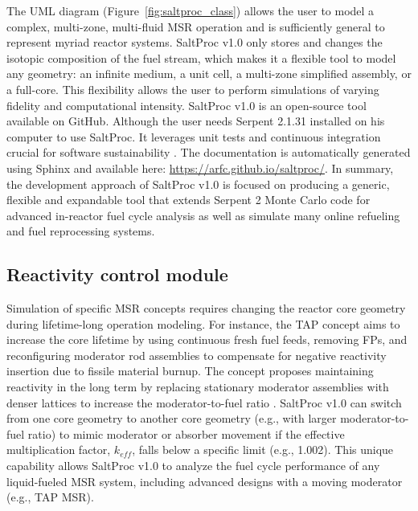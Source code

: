 The UML diagram (Figure~\ref{fig:saltproc_class}) allows the user to model a 
complex, multi-zone, multi-fluid \gls{MSR} operation and is sufficiently 
general to represent myriad reactor systems. SaltProc v1.0 only stores and 
changes the isotopic composition of the fuel stream, which makes it a flexible 
tool to model any geometry: an infinite medium, a unit cell, a multi-zone 
simplified assembly, or a full-core. This flexibility allows the user to 
perform simulations of varying fidelity and computational intensity. 
SaltProc v1.0 is an open-source tool available on GitHub. Although the user 
needs Serpent 2.1.31 installed on his computer to use SaltProc.  It leverages 
unit tests and continuous integration crucial for software sustainability 
\cite{krekel_pytest_2004, travis_travis-ci/travis-api_2016}. The documentation 
is automatically generated using Sphinx \cite{brandl_sphinx_2009} and 
available here: \url{https://arfc.github.io/saltproc/}. In summary, the 
development approach of SaltProc v1.0 is focused on producing a generic, 
flexible and expandable tool that extends Serpent 2 Monte Carlo code for 
advanced in-reactor fuel cycle analysis as well as simulate many online 
refueling and fuel reprocessing systems.

\subsection{Reactivity control module}
Simulation of specific \gls{MSR} concepts requires changing the reactor core 
geometry during lifetime-long operation modeling. For instance, the \gls{TAP} 
concept aims to increase the core lifetime by using continuous fresh fuel 
feeds, removing \glspl{FP}, and reconfiguring moderator rod assemblies to 
compensate for negative reactivity insertion due to fissile material burnup. 
The concept proposes maintaining reactivity in the long term by replacing 
stationary moderator assemblies with denser lattices to increase the 
moderator-to-fuel ratio \cite{betzler_assessment_2017-1}. 
SaltProc v1.0 can switch from one core geometry to another core geometry  
(e.g., with larger moderator-to-fuel ratio) to mimic moderator or absorber 
movement if the effective multiplication factor, $k_{eff}$, falls below a 
specific limit (e.g., 1.002). This unique capability allows SaltProc v1.0 to 
analyze the fuel cycle performance of any liquid-fueled \gls{MSR} system, 
including advanced designs with a moving moderator (e.g., \gls{TAP} \gls{MSR}).

